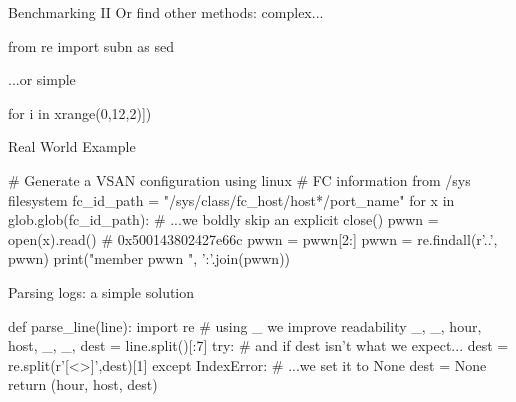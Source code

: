 \begin{frame}[fragile]{Benchmarking II}
Or find other methods: complex...
\begin{pythoncode}
from re import subn as sed
\end{pythoncode}
...or simple
\begin{pythoncode}
    for i in xrange(0,12,2)])
\end{pythoncode}
\end{frame}

%

\begin{frame}[fragile]{Real World Example}
\begin{pythoncode}
# Generate a VSAN configuration using linux 
#  FC information from /sys filesystem
fc_id_path = "/sys/class/fc_host/host*/port_name"
for x in glob.glob(fc_id_path):
    # ...we boldly skip an explicit close()
    pwwn = open(x).read()  # 0x500143802427e66c
    pwwn = pwwn[2:]
    pwwn = re.findall(r'..', pwwn)
    print("member pwwn ", ':'.join(pwwn))

\end{pythoncode}
\end{frame}

\begin{frame}[fragile]{Parsing logs: a simple solution}
\begin{pythoncode}
def parse_line(line):
    import re
    # using _ we improve readability
    _, _, hour, host, _, _, dest = line.split()[:7]
    try:
        # and if dest isn't what we expect...
        dest = re.split(r'[<>]',dest)[1]
    except IndexError:
        # ...we set it to None
        dest = None
    return (hour, host, dest)
\end{pythoncode}
\end{frame}
